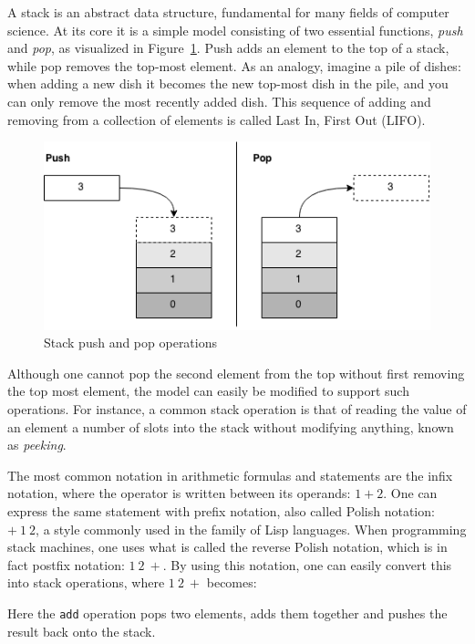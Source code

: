 A stack is an abstract data structure, fundamental for many fields of computer
science. At its core it is a simple model consisting of two essential functions,
{\it push} and {\it pop}, as visualized in Figure~\ref{fig:stack}. Push adds an
element to the top of a stack, while pop removes the top-most element. As an
analogy, imagine a pile of dishes: when adding a new dish it becomes the new
top-most dish in the pile, and you can only remove the most recently added
dish. This sequence of adding and removing from a collection of elements is
called Last In, First Out (LIFO).
\begin{figure}[h]
  \centering
  \includegraphics[scale=0.6]{images/stack.png}
  \caption{Stack push and pop operations}
\label{fig:stack}
\end{figure}

Although one cannot pop the second element from the top without first removing
the top most element, the model can easily be modified to support such
operations. For instance, a common stack operation is that of reading the value
of an element a number of slots into the stack without modifying anything, known
as {\it peeking}.

The most common notation in arithmetic formulas and statements are the infix
notation, where the operator is written between its operands: $1 + 2$. One can
express the same statement with prefix notation, also called Polish notation:
$+\ 1\ 2$, a style commonly used in the family of Lisp languages. When
programming stack machines, one uses what is called the reverse Polish notation,
which is in fact postfix notation: $1\ 2\ +$. By using this notation, one can
easily convert this into stack operations, where $1\ 2\ +$ becomes:
\begin{stackops}
\end{stackops}

Here the {\tt add} operation pops two elements, adds them together and pushes
the result back onto the stack.

